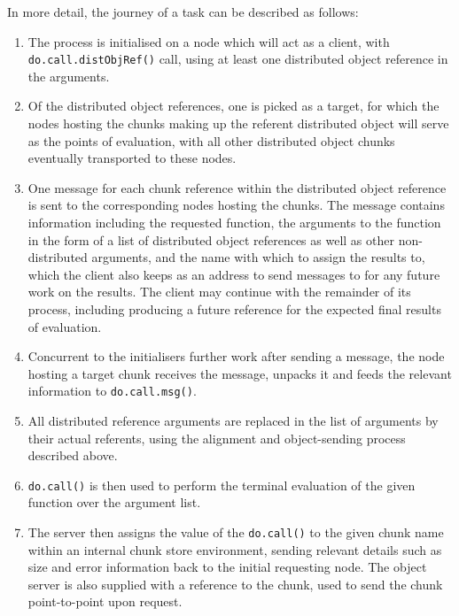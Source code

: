 \documentclass[a4paper,10pt]{article}
\begin{document}
In more detail, the journey of a task can be described as follows:

\begin{enumerate}
	\item The process is initialised on a node which will act as a client,
		with \texttt{do.call.distObjRef()} call, using at least
		one distributed object reference in the arguments.

	\item Of the distributed object references, one is picked as a target,
		for which the nodes hosting the chunks making up the referent
		distributed object will serve as the points of evaluation, with
		all other distributed object chunks eventually transported to
		these nodes.

	\item One message for each chunk reference within the distributed
		object reference is sent to the corresponding nodes hosting the
		chunks.  The message contains information including the
		requested function, the arguments to the function in the form
		of a list of distributed object references as well as other
		non-distributed arguments, and the name with which to assign
		the results to, which the client also keeps as an address to
		send messages to for any future work on the results.  The
		client may continue with the remainder of its process,
		including producing a future reference for the expected final
		results of evaluation.

	\item Concurrent to the initialisers further work after sending a
		message, the node hosting a target chunk receives the message,
		unpacks it and feeds the relevant information to
		\texttt{do.call.msg()}.

	\item All distributed reference arguments are replaced in the list of
		arguments by their actual referents, using the alignment and
		object-sending process described above.

	\item \texttt{do.call()} is then used to perform the terminal
		evaluation of the given function over the argument list.

	\item The server then assigns the value of the
		\texttt{do.call()} to the given chunk name within an
		internal chunk store environment, sending relevant details such
		as size and error information back to the initial requesting
		node.  The object server is also supplied with a reference to
		the chunk, used to send the chunk point-to-point upon request.
\end{enumerate}
\end{document}
